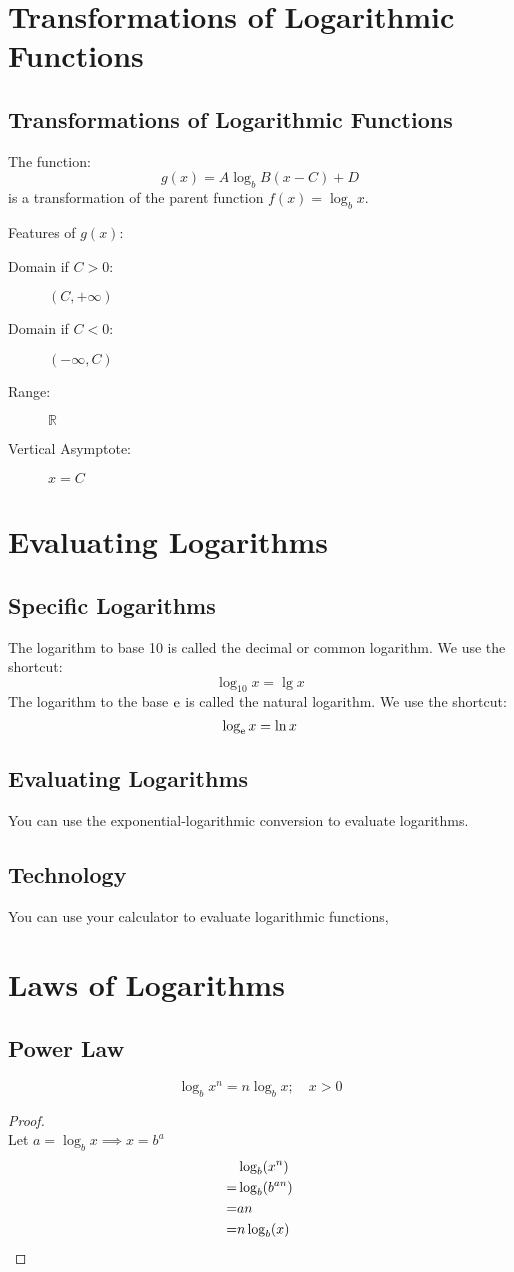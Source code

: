 	\section{Transformations of Logarithmic Functions}
		\subsection{Transformations of Logarithmic Functions}
			The function:
			\[g(x) = A\log_b B(x-C)+D\]
			is a transformation of the parent function $f(x)=\log_b x$.

			Features of $g(x)$:
			\begin{description}
				\item[Domain if $C>0$:] $(C, +\infty)$
				\item[Domain if $C<0$:] $(-\infty, C)$
				\item[Range:] $\mathbb{R}$
				\item[Vertical Asymptote:] $x=C$
			\end{description}
	\section{Evaluating Logarithms}
		\subsection{Specific Logarithms}
			The logarithm to base 10 is called the decimal or common logarithm. We use the shortcut:
			\[\log_{10} x = \lg x\]
			The logarithm to the base $\mathrm{e}$ is called the natural logarithm. We use the shortcut:
			\[\log_{\mathrm{e}} x = \ln x\]
		\subsection{Evaluating Logarithms}
			You can use the exponential-logarithmic conversion to evaluate logarithms.
		\subsection{Technology}
			You can use your calculator to evaluate logarithmic functions,
	\section{Laws of Logarithms}
		\subsection{Power Law}
			\[\log_b x^n = n \log_b x; \quad x > 0\]
			\begin{proof}~
				\\
				Let $a = \log_b x \implies x = b^a$
				\begin{align*}
					 &\log_b(x^n) \\
					=&\log_b(b^{an}) \\
					=&an \\
					=&n\log_b(x) \qedhere
				\end{align*}
			\end{proof}
